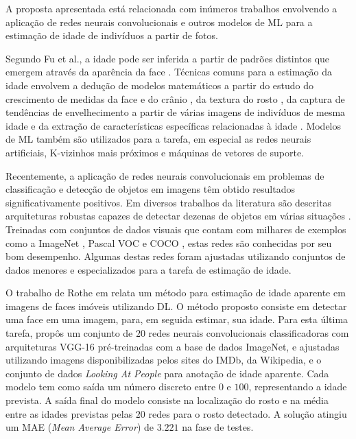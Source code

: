 
A proposta apresentada está relacionada com inúmeros trabalhos envolvendo a aplicação de redes neurais convolucionais e outros modelos de ML para a estimação de idade de indivíduos a partir de fotos.

Segundo Fu et al., a idade pode ser inferida a partir de padrões distintos que emergem através da aparência da face \cite{fu2010age}. Técnicas comuns para a estimação da idade envolvem a dedução de modelos matemáticos a partir do estudo do crescimento de medidas da face e do crânio \cite{kwon1999age}, da textura do rosto \cite{lanitis2002toward}, da captura de tendências de envelhecimento a partir de várias imagens de indivíduos de mesma idade \cite{fu2007estimating} e da extração de características específicas relacionadas à idade \cite{suo2008design, lou2018expression}. Modelos de ML também são utilizados para a tarefa, em especial as redes neurais artificiais, K-vizinhos mais próximos e máquinas de vetores de suporte.

Recentemente, a aplicação de redes neurais convolucionais em problemas de classificação e detecção de objetos em imagens têm obtido resultados significativamente positivos. Em  diversos trabalhos da literatura são descritas arquiteturas robustas capazes de detectar dezenas de objetos em várias situações \cite{vggnet, resnet, inception, redmon2016you, ssd}. Treinadas com conjuntos de dados visuais que contam com milhares de exemplos como a ImageNet \cite{ImagenetChall}, Pascal VOC \cite{pascalvoc} e COCO \cite{coco}, estas redes são conhecidas por seu bom desempenho. Algumas destas redes foram ajustadas utilizando conjuntos de dados menores e especializados para a tarefa de estimação de idade.

O trabalho de Rothe em \cite{rothe2015dex} relata um método para estimação de idade aparente em imagens de faces imóveis utilizando DL. O método proposto consiste em detectar uma face em uma imagem, para, em seguida estimar, sua idade. Para esta última tarefa, propôs um conjunto de $20$ redes neurais convolucionais classificadoras com arquiteturas VGG-16 pré-treinadas com a base de dados ImageNet, e ajustadas utilizando imagens disponibilizadas pelos sites do IMDb, da Wikipedia, e o conjunto de dados \emph{Looking At People} para anotação de idade aparente. Cada modelo tem como saída um número discreto entre $0$ e $100$, representando a idade prevista. A saída final do modelo consiste na localização do rosto e na média entre as idades previstas pelas $20$ redes para o rosto detectado. A solução atingiu um MAE (\emph{Mean Average Error}) de $3.221$ na fase de testes.

